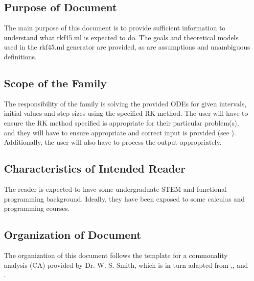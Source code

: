 \documentclass[12pt]{article}
\newcommand{\famname}{rkf45.ml} %
\begin{document}
\subsection{Purpose of Document}
The main purpose of this document is to provide sufficient information to 
understand what \famname{} is expected to do. The goals and theoretical models 
used in the 
\famname{} generator are provided, as are assumptions and unambiguous 
definitions.

\subsection{Scope of the Family}
The responsibility of the family is solving the provided ODEs for given 
intervals, initial values and step sizes using the specified RK method. The 
user will have to ensure the RK method specified is appropriate for their 
particular problem(s), and they will have to ensure appropriate and correct 
input is provided (see ). 
Additionally, the user will also have to process the output appropriately.


\subsection{Characteristics of Intended Reader} 
The reader is expected to have some undergraduate STEM and functional
programming background. Ideally, they have been exposed to some calculus and
programming courses. 


\subsection{Organization of Document}
The organization of this document follows the template for a commonality 
analysis (CA) provided by Dr. W. S. Smith,  which is in turn adapted from 
\cite{Lai2004},\cite{SmithAndLai2005}, \cite{Smith2006} and 
\cite{SmithEtAl2007}.
\end{document}
